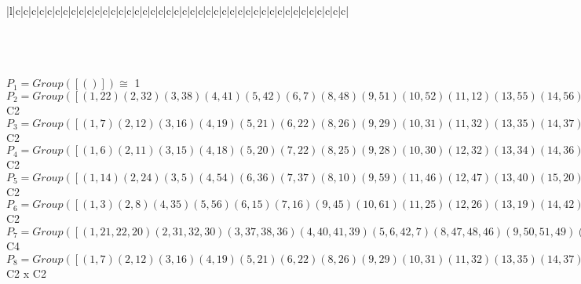 \documentclass[varwidth=\maxdimen,border=10]{standalone}
\begin{document}
\begin{tabular}
\begin{array}{|l|c|c|c|c|c|c|c|c|c|c|c|c|c|c|c|c|c|c|c|c|c|c|c|c|c|c|c|c|c|c|c|c|c|c|c|c|c|c|c|c|c|c|}
\end{array}\)\\
\ \\
\ \\
$P_{1} = Group( [ () ] )\cong$ 1\ \\
$P_{2} = Group( [ ( 1,22)( 2,32)( 3,38)( 4,41)( 5,42)( 6, 7)( 8,48)( 9,51)(10,52)(11,12)(13,55)(14,56)(15,16)(17,57)(18,19)(20,21)(23,60)(24,61)(25,26)(27,62)(28,29)(30,31)(33,63)(34,35)(36,37)(39,40)(43,64)(44,45)(46,47)(49,50)(53,54)(58,59) ] )\cong$ C2\ \\
$P_{3} = Group( [ ( 1, 7)( 2,12)( 3,16)( 4,19)( 5,21)( 6,22)( 8,26)( 9,29)(10,31)(11,32)(13,35)(14,37)(15,38)(17,40)(18,41)(20,42)(23,45)(24,47)(25,48)(27,50)(28,51)(30,52)(33,54)(34,55)(36,56)(39,57)(43,59)(44,60)(46,61)(49,62)(53,63)(58,64) ] )\cong$ C2\ \\
$P_{4} = Group( [ ( 1, 6)( 2,11)( 3,15)( 4,18)( 5,20)( 7,22)( 8,25)( 9,28)(10,30)(12,32)(13,34)(14,36)(16,38)(17,39)(19,41)(21,42)(23,44)(24,46)(26,48)(27,49)(29,51)(31,52)(33,53)(35,55)(37,56)(40,57)(43,58)(45,60)(47,61)(50,62)(54,63)(59,64) ] )\cong$ C2\ \\
$P_{5} = Group( [ ( 1,14)( 2,24)( 3, 5)( 4,54)( 6,36)( 7,37)( 8,10)( 9,59)(11,46)(12,47)(13,40)(15,20)(16,21)(17,35)(18,63)(19,33)(22,56)(23,50)(25,30)(26,31)(27,45)(28,64)(29,43)(32,61)(34,57)(38,42)(39,55)(41,53)(44,62)(48,52)(49,60)(51,58) ] )\cong$ C2\ \\
$P_{6} = Group( [ ( 1, 3)( 2, 8)( 4,35)( 5,56)( 6,15)( 7,16)( 9,45)(10,61)(11,25)(12,26)(13,19)(14,42)(17,53)(18,55)(20,37)(21,36)(22,38)(23,29)(24,52)(27,58)(28,60)(30,47)(31,46)(32,48)(33,39)(34,41)(40,63)(43,49)(44,51)(50,64)(54,57)(59,62) ] )\cong$ C2\ \\
$P_{7} = Group( [ ( 1,21,22,20)( 2,31,32,30)( 3,37,38,36)( 4,40,41,39)( 5, 6,42, 7)( 8,47,48,46)( 9,50,51,49)(10,11,52,12)(13,54,55,53)(14,15,56,16)(17,18,57,19)(23,59,60,58)(24,25,61,26)(27,28,62,29)(33,34,63,35)(43,44,64,45), ( 1,22)( 2,32)( 3,38)( 4,41)( 5,42)( 6, 7)( 8,48)( 9,51)(10,52)(11,12)(13,55)(14,56)(15,16)(17,57)(18,19)(20,21)(23,60)(24,61)(25,26)(27,62)(28,29)(30,31)(33,63)(34,35)(36,37)(39,40)(43,64)(44,45)(46,47)(49,50)(53,54)(58,59) ] )\cong$ C4\ \\
$P_{8} = Group( [ ( 1, 7)( 2,12)( 3,16)( 4,19)( 5,21)( 6,22)( 8,26)( 9,29)(10,31)(11,32)(13,35)(14,37)(15,38)(17,40)(18,41)(20,42)(23,45)(24,47)(25,48)(27,50)(28,51)(30,52)(33,54)(34,55)(36,56)(39,57)(43,59)(44,60)(46,61)(49,62)(53,63)(58,64), ( 1,22)( 2,32)( 3,38)( 4,41)( 5,42)( 6, 7)( 8,48)( 9,51)(10,52)(11,12)(13,55)(14,56)(15,16)(17,57)(18,19)(20,21)(23,60)(24,61)(25,26)(27,62)(28,29)(30,31)(33,63)(34,35)(36,37)(39,40)(43,64)(44,45)(46,47)(49,50)(53,54)(58,59) ] )\cong$ C2 x C2\ \\

\end{tabular}
\end{document}
